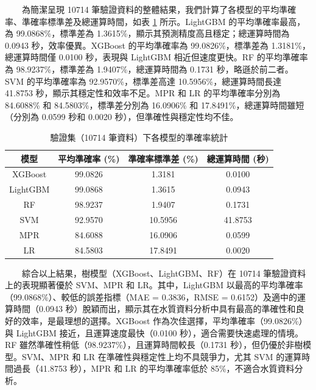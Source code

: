 \documentclass[12pt,a4paper]{article}
\begin{document}
\begin{enumerate}
\begin{enumerate}[label=\arabic*.]
\begin{enumerate}[label=3-2-\arabic*.]
\begin{enumerate}[label=\Alph*.]
                        　　為簡潔呈現 10714 筆驗證資料的整體結果，我們計算了各模型的平均準確率、準確率標準差及總運算時間，如表 \ref{table:accuracy_data} 所示。LightGBM 的平均準確率最高，為 99.0868\%，標準差為 1.3615\%，顯示其預測精度高且穩定；總運算時間為 0.0943 秒，效率優異。XGBoost 的平均準確率為 99.0826\%，標準差為 1.3181\%，總運算時間僅 0.0100 秒，表現與 LightGBM 相近但速度更快。RF 的平均準確率為 98.9237\%，標準差為 1.9407\%，總運算時間為 0.1731 秒，略遜於前二者。SVM 的平均準確率為 92.9570\%，標準差高達 10.5956\%，總運算時間長達 41.8753 秒，顯示其穩定性和效率不足。MPR 和 LR 的平均準確率分別為 84.6088\% 和 84.5803\%，標準差分別為 16.0906\% 和 17.8491\%，總運算時間雖短（分別為 0.0599 秒和 0.0020 秒），但準確性與穩定性均不佳。
                        \begin{table}[H]
                            \centering
                            \caption{驗證集（10714 筆資料）下各模型的準確率統計}
                            \label{table:accuracy_data}
                            \begin{tabular}{|c|c|c|c|}
                                \hline
                                模型 & 平均準確率 (\%) & 準確率標準差 (\%) & 總運算時間 (秒) \\
                                \hline
                                XGBoost & 99.0826 & 1.3181 & 0.0100 \\
                                LightGBM & 99.0868 & 1.3615 & 0.0943 \\
                                RF & 98.9237 & 1.9407 & 0.1731 \\
                                SVM & 92.9570 & 10.5956 & 41.8753 \\
                                MPR & 84.6088 & 16.0906 & 0.0599 \\
                                LR & 84.5803 & 17.8491 & 0.0020 \\
                                \hline
                            \end{tabular}
                        \end{table}
                        　　綜合以上結果，樹模型（XGBoost、LightGBM、RF）在 10714 筆驗證資料上的表現顯著優於 SVM、MPR 和 LR。其中，LightGBM 以最高的平均準確率（99.0868\%）、較低的誤差指標（MAE = 0.3836，RMSE = 0.6152）及適中的運算時間（0.0943 秒）脫穎而出，顯示其在水質資料分析中具有最高的準確性和良好的效率，是最理想的選擇。XGBoost 作為次佳選擇，平均準確率（99.0826\%）與 LightGBM 接近，且運算速度最快（0.0100 秒），適合需要快速處理的情境。RF 雖然準確性稍低（98.9237\%），且運算時間較長（0.1731 秒），但仍優於非樹模型。SVM、MPR 和 LR 在準確性與穩定性上均不具競爭力，尤其 SVM 的運算時間過長（41.8753 秒），MPR 和 LR 的平均準確率低於 85\%，不適合水質資料分析。\\

\end{enumerate}
\end{enumerate}
\end{enumerate}
\end{enumerate}
\end{document}
